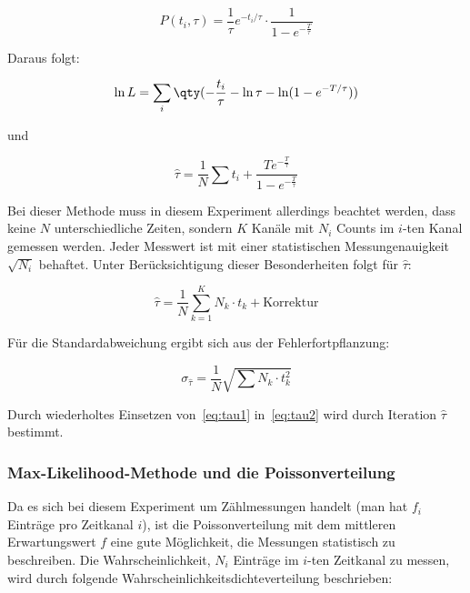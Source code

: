 \documentclass[slug=LM, room=Andreas-Schubert-Bau\,\ K\ 1A, supervisor=Anne-Sophie\ Berthold, coursedate=13.\ 12.\ 2019]{../../Lab_Report_LaTeX/lab_report}
\begin{document}
\begin{equation}\label{eq:modzerfall}
 P(t_i,\tau) = \frac{1}{\tau}e^{-t_i/\tau} \cdot \frac{1}{1-e^{-\frac{T}{\tau}}}
\end{equation}

Daraus folgt:

\begin{equation}\label{eq:delta-tau}
 \ln L = \sum_i \qty(-\frac{t_i}{\tau} - \ln\tau - \ln(1-e^{-T/\tau}))
\end{equation}

und

\begin{equation}\label{eq:tau2}
 \hat\tau = \frac{1}{N} \sum t_i + \frac{T e^{-\frac{T}{\tau}}}{1-e^{-\frac{T}{\tau}}}
\end{equation}

Bei dieser Methode muss in diesem Experiment allerdings beachtet werden, dass keine \(N\)
unterschiedliche Zeiten, sondern \(K\) Kanäle mit \(N_i\) Counts im \(i\)-ten Kanal gemessen
werden. Jeder Messwert ist mit einer statistischen Messungenauigkeit \(\sqrt{N_i}\) behaftet.
Unter Berücksichtigung dieser Besonderheiten folgt für \(\hat\tau\):

\begin{equation}\label{eq:tau1}
 \hat\tau = \frac{1}{N} \sum_{k=1}^{K}N_k\cdot t_k + \text{Korrektur}
\end{equation}

Für die Standardabweichung ergibt sich aus der Fehlerfortpflanzung:

\begin{equation}\label{key}
 \sigma_{\hat\tau} = \frac{1}{N} \sqrt{\sum N_k \cdot t_k^2}
\end{equation}

Durch wiederholtes Einsetzen von~\ref{eq:tau1} in~\ref{eq:tau2} wird durch Iteration \(\hat\tau\)
bestimmt.

\subsubsection{Max-Likelihood-Methode und die Poissonverteilung}
\label{sec:likepoisson}

Da es sich bei diesem Experiment um Zählmessungen handelt (man hat \(f_i\) Einträge pro
Zeitkanal \(i\)), ist die Poissonverteilung mit dem mittleren Erwartungswert \(f\) eine gute
Möglichkeit, die Messungen statistisch zu  beschreiben. Die Wahrscheinlichkeit, \(N_i\) Einträge
im \(i\)-ten Zeitkanal zu messen, wird durch folgende Wahrscheinlichkeitsdichteverteilung
beschrieben:
\end{document}
